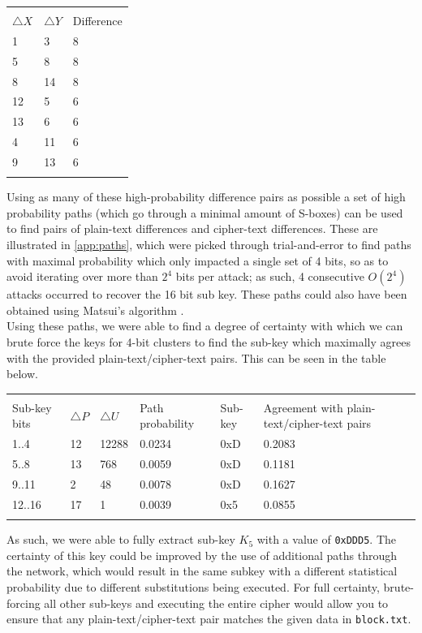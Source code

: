 \documentclass[british,10pt,a4paper]{article}
\begin{document}
\begin{center}
	\begin{tabular}{lll}\label{tab:diffpairs} \\
		\toprule \\
		$\triangle X$ & $\triangle Y$ & Difference \\
		1 & 3 & 8 \\
    	5 & 8 & 8 \\
    	8 & 14 & 8 \\
    	12 & 5 & 6 \\
    	13 & 6 & 6 \\
    	4 & 11 & 6 \\
    	9 & 13 & 6 \\
		\bottomrule \\
	\end{tabular}
\end{center}

Using as many of these high-probability difference pairs as possible a set of high probability paths (which go through a minimal amount of S-boxes) can be used to find pairs of plain-text differences and cipher-text differences. These are illustrated in \autoref{app:paths}, which were picked through trial-and-error to find paths with maximal probability which only impacted a single set of 4 bits, so as to avoid iterating over more than \(2^4\) bits per attack; as such, 4 consecutive \(O(2^4)\) attacks occurred to recover the 16 bit sub key. These paths could also have been obtained using Matsui's algorithm \cite{matsui}. 
\\ 
Using these paths, we were able to find a degree of certainty with which we can brute force the keys for 4-bit clusters to find the sub-key which maximally agrees with the provided plain-text/cipher-text pairs. This can be seen in the table below.
\begin{center}
	\begin{tabular}{llllll}\label{tab:pathprobabilities} \\
		\toprule \\
		Sub-key bits & $\triangle P$ & $\triangle U$ & Path probability &  Sub-key & Agreement with plain-text/cipher-text pairs\\
		1..4 & 12 & 12288 & 0.0234 & 0xD & 0.2083\\ 
		5..8 & 13 & 768 & 0.0059 & 0xD & 0.1181\\ 
		9..11 & 2 & 48 & 0.0078 & 0xD & 0.1627\\
		12..16 & 17 & 1 & 0.0039 & 0x5 & 0.0855\\ 
		\bottomrule \\
	\end{tabular}
\end{center}
As such, we were able to fully extract sub-key \(K_5\) with a value of \lstinline{0xDDD5}. The certainty of this key could be improved by the use of additional paths through the network, which would result in the same subkey with a different statistical probability due to different substitutions being executed. For full certainty, brute-forcing all other sub-keys and executing the entire cipher would allow you to ensure that any plain-text/cipher-text pair matches the given data in \lstinline{block.txt}.
\end{document}
